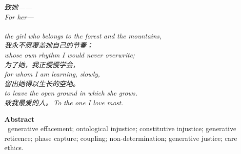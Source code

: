\documentclass[11pt,a4paper]{article}
\begin{document}
\thispagestyle{empty}
\vspace*{4.5cm}
\begin{center}
\begin{minipage}{0.74\linewidth}
\centering\itshape\color{rose}
{\cjk 致她——}\\[0.3em]
For her---\\[0.7em]
\\[0.2em]
the girl who belongs to the forest and the mountains,\\[0.5em]
{\cjk 我永不愿覆盖她自己的节奏；}\\[0.2em]
whose own rhythm I would never overwrite;\\[0.7em]
\itshape {\cjk 为了她，我正慢慢学会，}\\[0.2em]
for whom I am learning, slowly,\\[0.5em]
{\cjk 留出她得以生长的空地。}\\[0.2em]
to leave the open ground in which she grows.\\[1.0em]
{\upshape\footnotesize\color{gold} {\cjk 致我最爱的人。}\,\;To the one I love most.}
\end{minipage}
\end{center}
\newpage

\thispagestyle{empty}
\noindent\textbf{\large\color{rosedeep} Abstract}\\[0.6em]


\vspace{1.2em}
\, \textcolor{inksoft}{generative effacement; ontological injustice; constitutive injustice; generative reticence; phase capture; coupling; non-determination; generative justice; care ethics.}
\newpage

\tableofcontents
\newpage


\printbibliography[heading=bibintoc]
\end{document}
